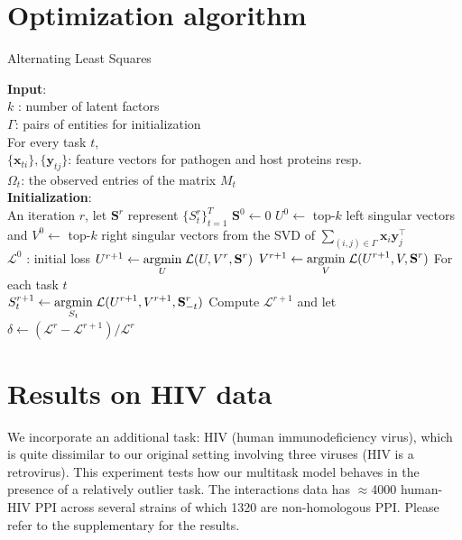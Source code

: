 \documentclass[a4paper,11pt]{article}
\newcommand{\argmin}{\operatornamewithlimits{argmin}}
\begin{document}


\section{Optimization algorithm}

\begin{algorithm}[!h]   \caption{Alternating Least Squares}
   \label{alg}
   \begin{small}
\begin{algorithmic}[1]
\STATE \textbf{Input}: \\
$k$ : number of latent factors\\
$\Gamma$: pairs of entities for initialization\\
For every task $t$,\\
${\{\mathbf{x}_{ti}\}, \{\mathbf{y}_{tj}\}}$: feature vectors for pathogen and host proteins resp.\\
$\Omega_t$: the observed entries of the matrix $M_t$\\
\STATE \textbf{Initialization}: \\
\STATE An iteration $r$, let $\mathbf{S}^r$ represent $\{S^r_t\}_{t=1}^T$
\STATE $\mathbf{S}^0 \leftarrow 0$
\STATE $U^0 \leftarrow$ top-$k$ left singular vectors and $V^0 \leftarrow$ top-$k$ right singular vectors from the SVD of $\displaystyle{\sum_{(i,j) \in \Gamma}} \mathbf{x}_i \mathbf{y}_j^\intercal$\\
\STATE $\mathcal{L}^0$ : initial loss
\REPEAT
  \STATE $U^{r+1} \leftarrow \displaystyle{\argmin_{U}} \; \mathcal{L}(U, V^r, \mathbf{S}^r)$  \STATE $V^{r+1} \leftarrow \displaystyle{\argmin_{V}} \; \mathcal{L}(U^{r+1}, V, \mathbf{S}^r) $  \STATE For each task $t$\\
  \hspace{0.5cm} $S^{r+1}_t \leftarrow \displaystyle{\argmin_{S_t}} \; \mathcal{L}(U^{r+1}, V^{r+1}, \mathbf{S}^r_{-t}) $
  \STATE Compute $\mathcal{L}^{r+1}$ and let $\delta \leftarrow (\mathcal{L}^r - \mathcal{L}^{r+1})/\mathcal{L}^r$
\UNTIL {$\delta < \tau$}%
\end{algorithmic}\end{small}
\end{algorithm}


\section{Results on HIV data}
We incorporate an additional task: HIV (human immunodeficiency virus), which is quite dissimilar to our original setting involving three viruses (HIV is a retrovirus). This experiment tests how our multitask model behaves in the presence of a relatively outlier task. The interactions data has $\approx$4000 human-HIV PPI across several strains of which 1320 are non-homologous PPI. Please refer to the supplementary for the results.
\end{document}
